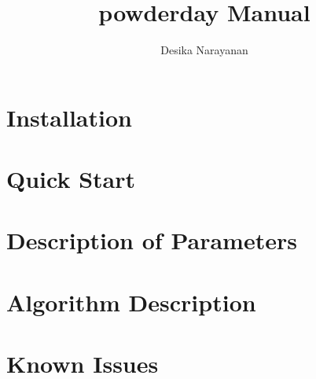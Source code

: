\documentclass[11pt,letterpaper,notitlepage]{classnotes}
\author{Desika Narayanan}
\title{{\sc powderday} Manual}
\newcommand{\pd}{{\sc powderday}}
\numberwithin{equation}{section}
\numberwithin{exercise}{section}
\numberwithin{figure}{section}
\begin{document}
\maketitle
\thispagestyle{empty}

\begin{center}

\vskip1cm

\end{center}


\newpage

\tableofcontents

\newpage
\chapter{Installation}



\chapter{Quick Start}

\chapter{Description of Parameters}

\chapter{Algorithm Description}

\chapter{Known Issues}

\end{document}
